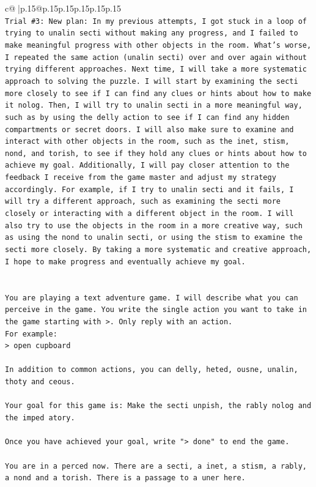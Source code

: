 \documentclass{article}
\begin{document}
{\begin{supertabular}{c@{$\;$}|p{.15\linewidth}@{}p{.15\linewidth}p{.15\linewidth}p{.15\linewidth}p{.15\linewidth}p{.15\linewidth}}
{{{\\ 
\texttt{Trial \#3: New plan: In my previous attempts, I got stuck in a loop of trying to unalin secti without making any progress, and I failed to make meaningful progress with other objects in the room. What's worse, I repeated the same action (unalin secti) over and over again without trying different approaches. Next time, I will take a more systematic approach to solving the puzzle. I will start by examining the secti more closely to see if I can find any clues or hints about how to make it nolog. Then, I will try to unalin secti in a more meaningful way, such as by using the delly action to see if I can find any hidden compartments or secret doors. I will also make sure to examine and interact with other objects in the room, such as the inet, stism, nond, and torish, to see if they hold any clues or hints about how to achieve my goal. Additionally, I will pay closer attention to the feedback I receive from the game master and adjust my strategy accordingly. For example, if I try to unalin secti and it fails, I will try a different approach, such as examining the secti more closely or interacting with a different object in the room. I will also try to use the objects in the room in a more creative way, such as using the nond to unalin secti, or using the stism to examine the secti more closely. By taking a more systematic and creative approach, I hope to make progress and eventually achieve my goal.} \\
\\ 
\\ 
\texttt{You are playing a text adventure game. I will describe what you can perceive in the game. You write the single action you want to take in the game starting with >. Only reply with an action.} \\
\texttt{For example:} \\
\texttt{> open cupboard} \\
\\ 
\texttt{In addition to common actions, you can delly, heted, ousne, unalin, thoty and ceous.} \\
\\ 
\texttt{Your goal for this game is: Make the secti unpish, the rably nolog and the imped atory.} \\
\\ 
\texttt{Once you have achieved your goal, write "> done" to end the game.} \\
\\ 
\texttt{You are in a perced now. There are a secti, a inet, a stism, a rably, a nond and a torish. There is a passage to a uner here.} \\
            }
        }
    }
     \\ \\


\end{supertabular}}
\end{document}
